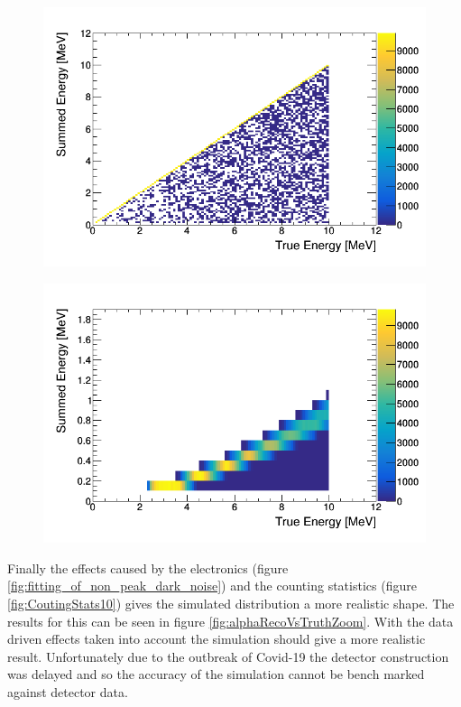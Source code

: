 \begin{figure}[htbp]
 \centering
 \includegraphics[width=0.7\linewidth]{truth_vs_summed_alpha.png}
 \label{fig:alpha_summed_vs_truth}
\end{figure}
\begin{figure}[htbp]
 \centering
 \includegraphics[width=0.7\linewidth]{Chapter4/Figs/Raster/truth_vs_visSummed_alpha_zoom.png}
 \label{fig:alphaVisVsTruthZoom}
\end{figure}


Finally the effects caused by the electronics (figure \ref{fig:fitting_of_non_peak_dark_noise}) and the counting statistics (figure \ref{fig:CoutingStats10}) gives the simulated distribution a more realistic shape. The results for this can be seen in figure \ref{fig:alphaRecoVsTruthZoom}. With the data driven effects taken into account the simulation should give a more realistic result. Unfortunately due to the outbreak of Covid-19 the detector construction was delayed and so the accuracy of the simulation cannot be bench marked against detector data. 

